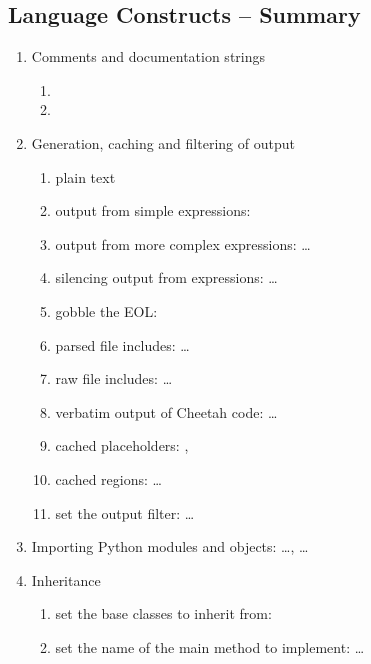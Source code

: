 \subsection{Language Constructs -- Summary}
\label{language.constructs}

\begin{enumerate}
\item Comments and documentation strings
     \begin{enumerate}
     \item {}
     \item {}
     \end{enumerate}

\item Generation, caching and filtering of output
     \begin{enumerate}
     \item plain text
     \item output from simple expressions: 
     \item output from more complex expressions:  \ldots
     \item silencing output from expressions:  \ldots
     \item gobble the EOL: 
     \item parsed file includes:  \ldots
     \item raw file includes:  \ldots
     \item verbatim output of Cheetah code:  \ldots {}
     \item cached placeholders: , 
     \item cached regions:  \ldots {}
     \item set the output filter:  \ldots
     \end{enumerate}
          
\item Importing Python modules and objects:  \ldots,
      \ldots

\item Inheritance 
     \begin{enumerate}
     \item set the base classes to inherit from: 
     \item set the name of the main method to implement:  \ldots
     \end{enumerate}


\end{enumerate}
